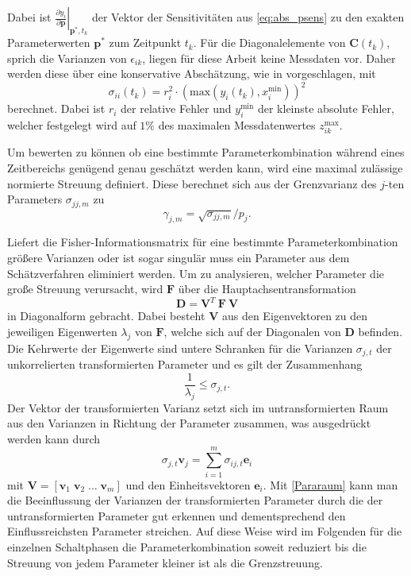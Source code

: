 Dabei ist $\left.\frac{\partial y_i}{\partial \pmb{p}}\right|_{\pmb{p}^*,t_k}$ der Vektor der Sensitivitäten aus \eqref{eq:abs_psens} zu den exakten Parameterwerten $\pmb{p}^*$ zum Zeitpunkt $t_k$. Für die Diagonalelemente von $\pmb{C}(t_k)$, sprich die Varianzen von $\epsilon_{ik}$, liegen für diese Arbeit keine Messdaten vor. Daher werden diese über eine konservative Abschätzung, wie in \cite{Majer.1998} vorgeschlagen, mit
\begin{equation}
\sigma_{ii}(t_k)=r_i^2\cdot\left(\mathrm{max}\left(y_i(t_k),x_i^\mathrm{min}\right)\right)^2
\end{equation}
berechnet. Dabei ist $r_i$ der relative Fehler und $y_i^\mathrm{min}$ der kleinste absolute Fehler, welcher festgelegt wird auf $1\%$ des maximalen Messdatenwertes $z^\mathrm{max}_{ik}$.

Um bewerten zu können ob eine bestimmte Parameterkombination während eines Zeitbereichs genügend genau geschätzt werden kann, wird eine maximal zulässige normierte Streuung definiert. Diese berechnet sich aus der Grenzvarianz des $j$-ten Parameters $\sigma_{jj,m}$ zu 
\begin{equation}
\gamma_{j,m} = \sqrt{\sigma_{jj,m}}/p_j.
\end{equation}

Liefert die Fisher-Informationsmatrix für eine bestimmte Parameterkombination   größere Varianzen oder ist sogar singulär muss ein Parameter aus dem Schätzverfahren eliminiert werden. Um zu analysieren, welcher Parameter die große Streuung verursacht, wird $\pmb{F}$ über die Hauptachsentransformation
\begin{equation}
\pmb{D} = \pmb{V}^T\ \pmb{F}\ \pmb{V}
\end{equation} 
in Diagonalform gebracht. Dabei besteht $\pmb{V}$ aus den Eigenvektoren zu den jeweiligen Eigenwerten $\lambda_j$ von $\pmb{F}$, welche sich auf der Diagonalen von $\pmb{D}$ befinden. Die Kehrwerte der Eigenwerte sind untere Schranken für die  Varianzen $\sigma_{j,t}$ der unkorrelierten transformierten Parameter und es gilt der Zusammenhang
\begin{equation}
\frac{1}{\lambda_j}\leq \sigma_{j,t}.
\end{equation}
Der Vektor der transformierten Varianz setzt sich im untransformierten Raum aus den Varianzen in Richtung der Parameter zusammen, was ausgedrückt werden kann durch
\begin{equation}\label{Pararaum}
\sigma_{j,t} \pmb{v}_j = \sum_{i=1}^m \sigma_{ij,t} \pmb{e}_i
\end{equation}
mit $\pmb{V} = [\pmb{v}_1\; \pmb{v}_2\; \dots \;\pmb{v}_m]$ und den Einheitsvektoren $\pmb{e}_i$. Mit \eqref{Pararaum} kann man die Beeinflussung der Varianzen der transformierten Parameter durch die der untransformierten Parameter gut erkennen und dementsprechend den Einflussreichsten Parameter streichen. Auf diese Weise wird im Folgenden für die einzelnen Schaltphasen die Parameterkombination soweit reduziert bis die Streuung von jedem Parameter kleiner ist als die Grenzstreuung.
 

